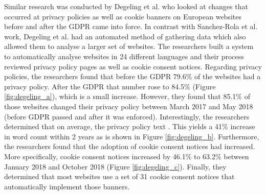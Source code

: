 \documentclass[../main.tex]{subfiles}
\begin{document}
Similar research was conducted by Degeling et al. \cite{degeling2018we} who looked at changes that occurred at privacy policies as well as cookie banners on European websites before and after the GDPR came into force. In contrast with Sanchez-Rola et al. work, Degeling et al. had an automated method of gathering data which also allowed them to analyse a larger set of websites. The researchers built a system to automatically analyse websites in 24 different languages and their process reviewed privacy policy pages as well as cookie consent notices. Regarding privacy policies, the researchers found that before the GDPR 79.6\% of the websites had a privacy policy. After the GDPR that number rose to 84.5\% (Figure \ref{fig:degeling_a}), which is a small increase. However, they found that 85.1\% of those websites changed their privacy policy between March 2017 and May 2018 (before GDPR passed and after it was enforced). Interestingly, the researchers determined that on average, the privacy policy text . This yields a 41\% increase in word count within 2 years as is shown in Figure \ref{fig:degeling_b}. Furthermore, the researchers found that the adoption of cookie consent notices had increased. More specifically, cookie consent notices increased by 46.1\% to 63.2\% between January 2018 and October 2018 (Figure \ref{fig:degeling_c}). Finally, they determined that most websites use a set of 31 cookie consent notices that automatically implement those banners. 
\end{document}
